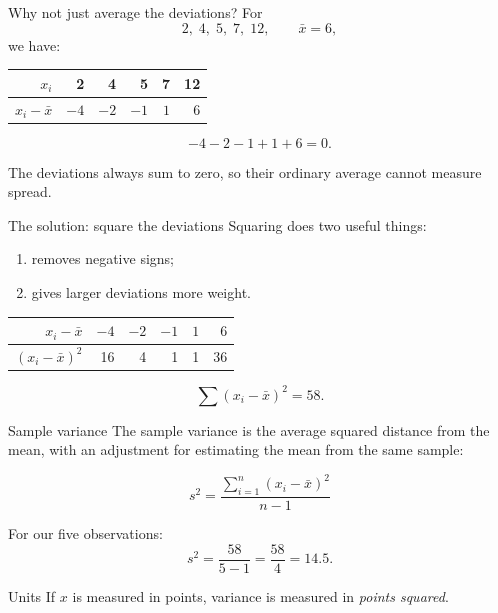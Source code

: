 \documentclass[11pt,aspectratio=169]{beamer}
\begin{document}
\begin{frame}{Why not just average the deviations?}
For
\[
2,\;4,\;5,\;7,\;12, \qquad \bar{x}=6,
\]
we have:

\begin{center}
\renewcommand{\arraystretch}{1.25}
\begin{tabular}{r|rrrrr}
$x_i$ & 2 & 4 & 5 & 7 & 12 \\
\midrule
$x_i-\bar{x}$ & $-4$ & $-2$ & $-1$ & $1$ & $6$ \\
\end{tabular}
\end{center}

\[
-4-2-1+1+6=0.
\]

\vfill
\alert{The deviations always sum to zero, so their ordinary average cannot measure spread.}
\end{frame}

\begin{frame}{The solution: square the deviations}
Squaring does two useful things:
\begin{enumerate}
  \item removes negative signs;
  \item gives larger deviations more weight.
\end{enumerate}

\vspace{0.7em}
\begin{center}
\renewcommand{\arraystretch}{1.25}
\begin{tabular}{r|rrrrr}
$x_i-\bar{x}$ & $-4$ & $-2$ & $-1$ & $1$ & $6$ \\
\midrule
$(x_i-\bar{x})^2$ & 16 & 4 & 1 & 1 & 36 \\
\end{tabular}
\end{center}

\[
\sum (x_i-\bar{x})^2=58.
\]
\end{frame}

\begin{frame}{Sample variance}
The sample variance is the average squared distance from the mean, with an adjustment for estimating the mean from the same sample:

\[
\boxed{s^2=\frac{\sum_{i=1}^{n}(x_i-\bar{x})^2}{n-1}}
\]

For our five observations:
\[
s^2=\frac{58}{5-1}=\frac{58}{4}=\boxed{14.5}.
\]

\vfill
\begin{block}{Units}
If $x$ is measured in points, variance is measured in \emph{points squared}.
\end{block}
\end{frame}
\end{document}

